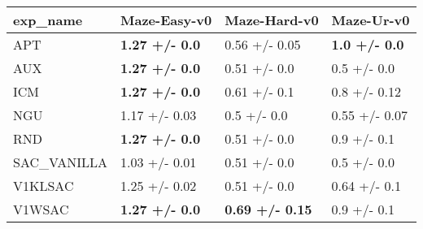 \begin{tabular}{llll}
\hline
 exp\_name    & Maze-Easy-v0          & Maze-Hard-v0           & Maze-Ur-v0           \\
\hline
 APT         & \textbf{1.27 +/- 0.0} & 0.56 +/- 0.05          & \textbf{1.0 +/- 0.0} \\
 AUX         & \textbf{1.27 +/- 0.0} & 0.51 +/- 0.0           & 0.5 +/- 0.0          \\
 ICM         & \textbf{1.27 +/- 0.0} & 0.61 +/- 0.1           & 0.8 +/- 0.12         \\
 NGU         & 1.17 +/- 0.03         & 0.5 +/- 0.0            & 0.55 +/- 0.07        \\
 RND         & \textbf{1.27 +/- 0.0} & 0.51 +/- 0.0           & 0.9 +/- 0.1          \\
 SAC\_VANILLA & 1.03 +/- 0.01         & 0.51 +/- 0.0           & 0.5 +/- 0.0          \\
 V1KLSAC     & 1.25 +/- 0.02         & 0.51 +/- 0.0           & 0.64 +/- 0.1         \\
 V1WSAC      & \textbf{1.27 +/- 0.0} & \textbf{0.69 +/- 0.15} & 0.9 +/- 0.1          \\
\hline
\end{tabular}